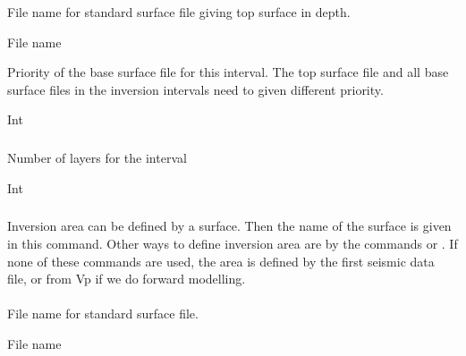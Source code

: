   
 \slist
   \item \Description File name for standard surface file giving top surface in depth.
   \item \Argument File name
   \item \Default
 \elist

 
 \slist
   \item \Description Priority of the base surface file for this interval. The top surface file and all base surface files in the inversion intervals need to given different priority.
   \item \Argument Int
   \item \Default
 \elist

\subparagraph{ \necessary} 
 \slist
   \item \Description Number of layers for the interval
   \item \Argument Int
   \item \Default
 \elist

\subsubsection{}
 \slist
   \item \Description Inversion area can be defined by a surface. Then
     the name of the surface is given in this command. Other ways to
     define inversion area are by the commands  or
     . If none of these commands are
     used, the area is defined by the first seismic data file, or from
     Vp if we do forward modelling.
   \item \Argument
   \item \Default
 \elist

\paragraph{}
\slist
   \item \Description File name for standard surface file.
   \item \Argument File name
   \item \Default
 \elist

